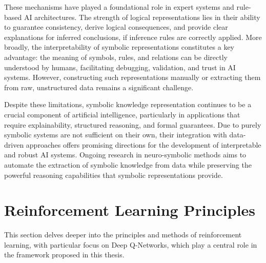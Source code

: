 \documentclass[12pt,a4paper]{report}
\begin{document}
These mechanisms have played a foundational role in expert systems and rule-based AI architectures.
The strength of logical representations lies in their ability to guarantee consistency, derive logical consequences, and provide clear explanations for inferred conclusions, if inference rules are correctly applied. More broadly, the interpretability of symbolic representations constitutes a key advantage: the meaning of symbols, rules, and relations can be directly understood by humans, facilitating debugging, validation, and trust in AI systems. However, constructing such representations manually or extracting them from raw, unstructured data remains a significant challenge.

Despite these limitations, symbolic knowledge representation continues to be a crucial component of artificial intelligence, particularly in applications that require explainability, structured reasoning, and formal guarantees. Due to purely symbolic systems are not sufficient on their own, their integration with data-driven approaches offers promising directions for the development of interpretable and robust AI systems. Ongoing research in neuro-symbolic methods aims to automate the extraction of symbolic knowledge from data while preserving the powerful reasoning capabilities that symbolic representations provide.

\section{Reinforcement Learning Principles}
This section delves deeper into the principles and methods of reinforcement learning, with particular focus on Deep Q-Networks, which play a central role in the framework proposed in this thesis.
\end{document}
